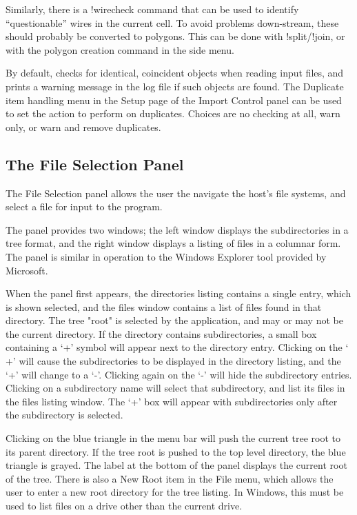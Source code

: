 Similarly, there is a {\cb !wirecheck} command that can be used to
identify ``questionable'' wires in the current cell.  To avoid
problems down-stream, these should probably be converted to polygons. 
This can be done with {\cb !split}/{\cb !join}, or with the polygon
creation command in the side menu.

By default, {\Xic} checks for identical, coincident objects when
reading input files, and prints a warning message in the log file if
such objects are found.  The {\cb Duplicate item handling} menu in the
{\cb Setup} page of the {\cb Import Control} panel can be used to set
the action to perform on duplicates.  Choices are no checking at all,
warn only, or warn and remove duplicates.


\subsection{The File Selection Panel}
\label{filesel}

The {\cb File Selection} panel allows the user the navigate the
host's file systems, and select a file for input to the program.

The panel provides two windows; the left window displays the
subdirectories in a tree format, and the right window displays a
listing of files in a columnar form.  The panel is similar in
operation to the {\et Windows Explorer} tool provided by {\et
Microsoft}.
       
When the panel first appears, the directories listing contains a
single entry, which is shown selected, and the files window contains a
list of files found in that directory.  The tree "root" is selected by
the application, and may or may not be the current directory.  If the
directory contains subdirectories, a small box containing a `{\vt +}'
symbol will appear next to the directory entry.  Clicking on the `{\vt
+}' will cause the subdirectories to be displayed in the directory
listing, and the `{\vt +}' will change to a `{\vt -}'.  Clicking again
on the `{\vt -}' will hide the subdirectory entries.  Clicking on a
subdirectory name will select that subdirectory, and list its files in
the files listing window.  The `{\vt +}' box will appear with
subdirectories only after the subdirectory is selected.
 
Clicking on the blue triangle in the menu bar will push the current
tree root to its parent directory.  If the tree root is pushed to the
top level directory, the blue triangle is grayed.  The label at the
bottom of the panel displays the current root of the tree.  There is
also a {\cb New Root} item in the {\cb File} menu, which allows the
user to enter a new root directory for the tree listing.  In Windows,
this must be used to list files on a drive other than the current
drive.

